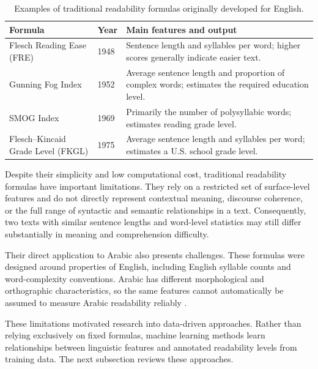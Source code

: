 \documentclass[12pt]{report}
\begin{document}
\begin{table}[H]
\centering
\caption{Examples of traditional readability formulas originally developed for English.}
\label{tab:traditional_readability}
\renewcommand{\arraystretch}{1.25}
\begin{tabular}{p{4.0cm} p{1.5cm} p{6.5cm}}
\toprule
\textbf{Formula} & \textbf{Year} & \textbf{Main features and output} \\
\midrule
Flesch Reading Ease (FRE) \cite{flesch1948readability} & 1948 &
Sentence length and syllables per word; higher scores generally indicate easier text. \\

Gunning Fog Index \cite{gunning1952technique} & 1952 &
Average sentence length and proportion of complex words; estimates the required education level. \\

SMOG Index \cite{smog} & 1969 &
Primarily the number of polysyllabic words; estimates reading grade level. \\

Flesch--Kincaid Grade Level (FKGL) \cite{kincaid1975derivation} & 1975 &
Average sentence length and syllables per word; estimates a U.S. school grade level. \\
\bottomrule
\end{tabular}
\end{table}



Despite their simplicity and low computational cost, traditional readability formulas have important limitations. They rely on a restricted set of surface-level features and do not directly represent contextual meaning, discourse coherence, or the full range of syntactic and semantic relationships in a text. Consequently, two texts with similar sentence lengths and word-level statistics may still differ substantially in meaning and comprehension difficulty.

Their direct application to Arabic also presents challenges. These formulas were designed around properties of English, including English syllable counts and word-complexity conventions. Arabic has different morphological and orthographic characteristics, so the same features cannot automatically be assumed to measure Arabic readability reliably \cite{habash2010introduction,nassiri2023approaches}.

These limitations motivated research into data-driven approaches. Rather than relying exclusively on fixed formulas, machine learning methods learn relationships between linguistic features and annotated readability levels from training data. The next subsection reviews these approaches.
\end{document}
